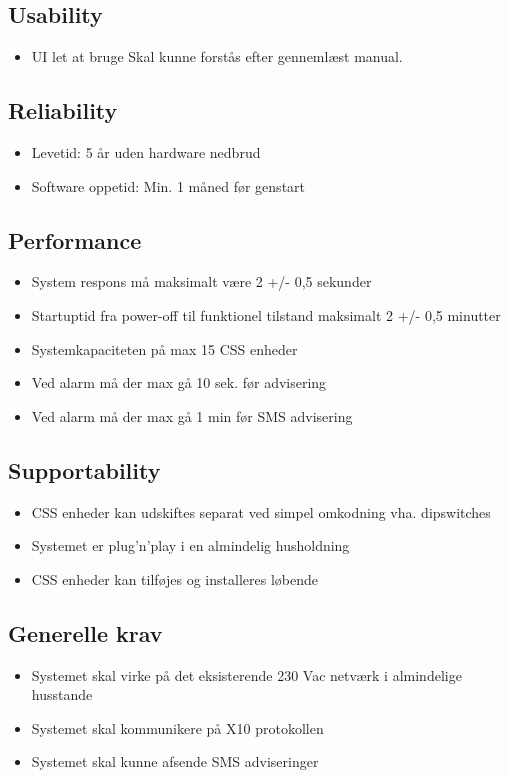 \subsection*{Usability}
\begin{itemize}
\item UI let at bruge
\subitem Skal kunne forstås efter gennemlæst manual.
\end{itemize}

\subsection*{Reliability}
\begin{itemize}
\item Levetid: 5 år uden hardware nedbrud
\item Software oppetid: Min. 1 måned før genstart
\end{itemize}

\subsection*{Performance}
\begin{itemize}
\item System respons må maksimalt være 2 +/- 0,5 sekunder
\item Startuptid fra power-off til funktionel tilstand maksimalt 2 +/- 0,5 minutter
\item Systemkapaciteten på max 15 CSS enheder
\item Ved alarm må der max gå 10 sek. før advisering
\item Ved alarm må der max gå 1 min før SMS advisering
\end{itemize}

\subsection*{Supportability}
\begin{itemize}
\item CSS enheder kan udskiftes separat ved simpel omkodning vha. dipswitches 
\item Systemet er plug’n’play i en almindelig husholdning
\item CSS enheder kan tilføjes og installeres løbende
\end{itemize}

\subsection*{Generelle krav}
\begin{itemize}
\item Systemet skal virke på det eksisterende 230 Vac netværk i almindelige husstande
\item Systemet skal kommunikere på X10 protokollen
\item Systemet skal kunne afsende SMS adviseringer
\end{itemize}

